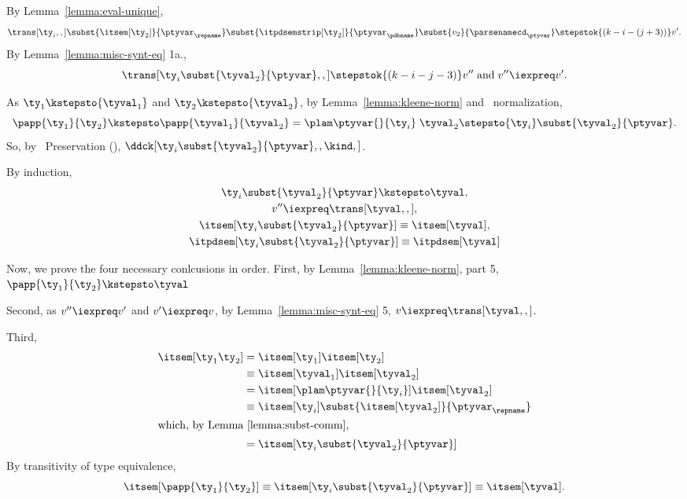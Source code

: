 \begin{list}{\textbf{Proof:}}{
      \setlength{\leftmargin}{0in}
      \setlength{\listparindent}{0in}}
\begin{caseproof}
By Lemma~\ref{lemma:eval-unique},
\[
   \trans[{\ty_i},,]\subst{\itsem[{\ty_2}]}{\ptyvar_\repname}\subst{\itpdsemstrip[{\ty_2}]}{\ptyvar_\pdbname}\subst{v_2}{\parsenamecd_\ptyvar} 
   \stepstok {(k-i-(j+3))} v'.
\]
By Lemma~\ref{lemma:misc-synt-eq} 1a.,
\[
  \trans[{\ty_i} \subst{\tyval_2}{\ptyvar},,] \stepstok {(k-i-j-3)}
  v'' \; \mbox{and}\; v'' \iexpreq v'.
\]

As ${\ty_1} \kstepsto {\tyval_1}$ and ${\ty_2} \kstepsto
{\tyval_2}$, by Lemma~\ref{lemma:kleene-norm} and \ddc\ normalization,
\[
  \papp {\ty_1} {\ty_2} \kstepsto \papp {\tyval_1} {\tyval_2}
  = {\plam \ptyvar {} {\ty_i}} \;{\tyval_2}  
  \stepsto {\ty_i}\subst{\tyval_2}{\ptyvar}.   
\]
So, by \ddc\ Preservation (),
  $\ddck[{\ty_i}\subst{\tyval_2}{\ptyvar},{},{\kind},]$.

By induction,
\begin{gather}  
  {\ty_i}\subst{\tyval_2}{\ptyvar} \kstepsto \tyval,\\
  v'' \iexpreq \trans[\tyval,,],\\
  \itsem[{\ty_i}\subst{\tyval_2}{\ptyvar}] \equiv \itsem[\tyval],\\
  \itpdsem[{\ty_i}\subst{\tyval_2}{\ptyvar}] \equiv \itpdsem[\tyval] 
\end{gather}

Now, we prove the four necessary conlcusions in order. First, by
Lemma~\ref{lemma:kleene-norm}, part 5,
$  \papp {\ty_1} {\ty_2} \kstepsto  \tyval$

Second, as $v'' \iexpreq v'$ and $v' \iexpreq v$, by Lemma~\ref{lemma:misc-synt-eq} 5,
  $v \iexpreq \trans[\tyval,,]$.

Third,
\begin{align*}
\itsem[{\ty_1} {\ty_2}] &= \itsem[{\ty_1}] \itsem[{\ty_2}] \\
&\equiv \itsem[{\tyval_1}] \itsem[{\tyval_2}]              \\
&= \itsem[{\plam \ptyvar {} {\ty_i}}] \itsem[{\tyval_2}]           \\
&\equiv \itsem[{\ty_i}] \subst{\itsem[{\tyval_2}]}{\ptyvar_\repname}     \\
\intertext{which, by Lemma~\ref{lemma:subst-comm},}
&= \itsem[{\ty_i}\subst{\tyval_2}{\ptyvar}]
\end{align*}
By transitivity of type equivalence,
\[\itsem[\papp {\ty_1} {\ty_2}] \equiv \itsem[{\ty_i}\subst{\tyval_2}{\ptyvar}] \equiv \itsem[\tyval].\]


\end{caseproof}
\end{list}
